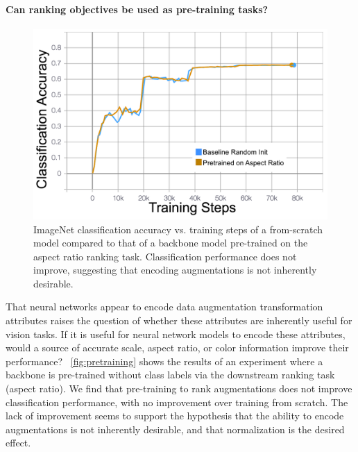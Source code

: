 \paragraph{Can ranking objectives be used as pre-training tasks?}
\begin{figure}
    \centering
    \includegraphics[width=\textwidth]{figures/dev_accuracy_labels.png}
    \caption{ImageNet classification accuracy vs. training steps of a from-scratch model compared to that of a backbone model pre-trained on the aspect ratio ranking task. Classification performance does not improve, suggesting that encoding augmentations is not inherently desirable.}
    \label{fig:pretraining}
\end{figure}
That neural networks appear to encode data augmentation transformation attributes raises the question of whether these attributes are inherently useful for vision tasks.  
If it is useful for neural network models to encode these attributes, would a source of accurate scale, aspect ratio, or color information improve their performance?
~\autoref{fig:pretraining} shows the results of an experiment where a backbone is pre-trained without class labels via the downstream ranking task (aspect ratio).
We find that pre-training to rank augmentations does not improve classification performance, with no improvement over training from scratch.
The lack of improvement seems to support the hypothesis that the ability to encode augmentations is not inherently desirable, and that normalization is the desired effect.


